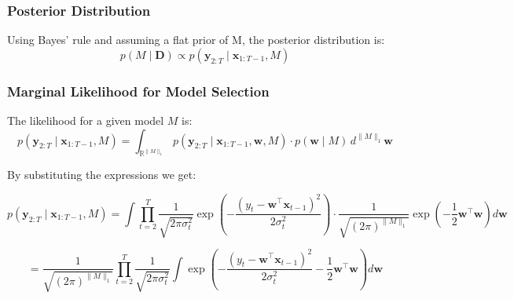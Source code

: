 \documentclass{article}
\begin{document}


\subsubsection*{Posterior Distribution}

Using Bayes' rule and assuming a flat prior of M, the posterior distribution is:
\[
p(M \mid \boldsymbol{D}) \propto p(\boldsymbol{y}_{2:T} \mid \boldsymbol{x}_{1:T-1}, M) 
\]


\subsubsection*{Marginal Likelihood for Model Selection}

The likelihood for a given model $M$ is:
\[
p(\boldsymbol{y}_{2:T} \mid \boldsymbol{x}_{1:T-1}, M) = 
\int _{\mathbb {R} ^{\|M\|_1}}
p(\boldsymbol{y}_{2:T} \mid \boldsymbol{x}_{1:T-1}, \boldsymbol{w}, M) \cdot p(\boldsymbol{w} \mid M) \, d^{\|M\|_1}\boldsymbol{w}
\]




By substituting the expressions we get:

\[
p(\boldsymbol{y}_{2:T} \mid \boldsymbol{x}_{1:T-1}, M) = \int 
\prod_{t=2}^T \frac{1}{\sqrt{2\pi \sigma_t^2}} \exp\left(-\frac{(y_t - \mathbf{w}^\top \mathbf{x}_{t-1})^2}{2 \sigma_t^2}\right)
\cdot 
\frac{1}{\sqrt{(2\pi)^{\|M\|_1} }} \exp\left(- \frac{1}{2} \mathbf{w}^\top\mathbf{w}    \right)
d\boldsymbol{w}
\]


\[
=
\frac{1}{\sqrt{(2\pi)^{\|M\|_1} }} 
\prod_{t=2}^T \frac{1}{\sqrt{2\pi \sigma_t^2}} 
\int 
\exp\left(-\frac{(y_t - \mathbf{w}^\top \mathbf{x}_{t-1})^2}{2 \sigma_t^2} - \frac{1}{2} \mathbf{w}^\top\mathbf{w}    \right)
d\boldsymbol{w}
\]
\end{document}
